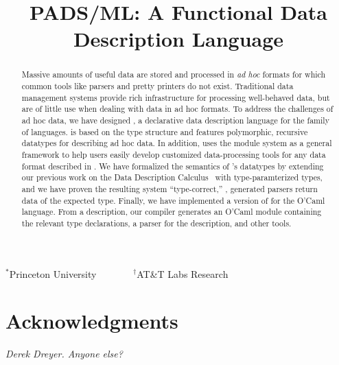 \documentclass[nocopyrightspace]{sigplanconf}
\begin{document}
\title{PADS/ML: A Functional Data Description Language}
{$^\ast$Princeton University \ \ \ \ \ \ \ $^\dagger$AT\&T Labs Research}
 { \ \ \ \ }



\maketitle{}

\begin{abstract}  

  Massive amounts of useful data are stored and processed in
  \textit{ad hoc} formats for which common tools like parsers and
  pretty printers do not exist.  Traditional data management 
  systems provide rich infrastructure for processing well-behaved
  data, but are of little use when dealing with data in ad hoc
  formats.  To address the challenges of ad hoc data, we have designed
  \padsml{}, a declarative data description language for the \ml{} family
  of languages.  \padsml{} is based on the \ml{} type structure and
  features polymorphic, recursive datatypes for describing ad hoc
  data.  In addition, \padsml{} uses the \ml{} module system as a general
  framework to help users easily develop customized data-processing
  tools for any data format described in \padsml{}.  We have formalized the
  semantics of \padsml{}'s datatypes by extending our previous work on
  the Data Description Calculus~\cite{fisher+:next700ddl} with
  type-paramterized types, and we have proven the resulting system
  ``type-correct,'' \ie{}, generated parsers return data of the
  expected type.  Finally, we have implemented a version of \padsml{}
  for the O'Caml language.  From a \padsml{} description, our compiler
  generates an O'Caml module containing the relevant type
  declarations, a parser for the description, and other tools.

\end{abstract}















\section*{Acknowledgments}

\emph{Derek Dreyer. Anyone else?}



%


\end{document}
